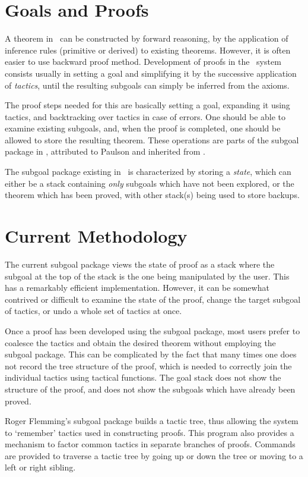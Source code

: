 
\section{Goals and Proofs}

A theorem in \HOL\ can be constructed by forward reasoning, by the
application of inference rules (primitive or derived) to existing
theorems. However, it is often easier to use backward proof method.
Development of proofs in the \HOL\ system consists usually in setting a
goal and simplifying it by the successive application of {\em
tactics}, until the resulting subgoals can simply be inferred from the
axioms.

The proof steps needed for this are basically setting a goal,
expanding it using tactics, and backtracking over tactics in case of 
errors. One should be able to examine existing subgoals, and, when the
proof is completed, one should be allowed to store the resulting
theorem. These operations are parts of the subgoal package in \HOL,
attributed to Paulson and inherited from \LCF.

The subgoal package existing in \HOL\ is characterized by storing a
{\em state}, which can either be a stack containing {\em only}
subgoals which have not been explored, or the theorem which has been
proved, with other stack(s) being used to store backups.

\section{Current Methodology}

The current subgoal package views the state of proof as a stack where
the subgoal at the top of the stack is the one being manipulated by
the user. This has a remarkably efficient implementation. However, it
can be somewhat contrived or difficult to examine the state of the
proof, change the target subgoal of tactics, or undo a whole set of
tactics at once.

Once a proof has been developed using the subgoal package, most users
prefer to coalesce the tactics and obtain the desired theorem without
employing the subgoal package. This can be complicated by the fact
that many times one does not record the tree structure of the proof,
which is needed to correctly join the individual tactics using
tactical functions. The goal stack does not show the structure of the
proof, and does not show the subgoals which have already been proved.

Roger Flemming's subgoal package builds a tactic tree, thus allowing
the system to `remember' tactics used in constructing proofs. This
program also provides a mechanism to factor common tactics in separate
branches of proofs. Commands are provided to traverse a tactic tree by
going up or down the tree or moving to a left or right sibling.


